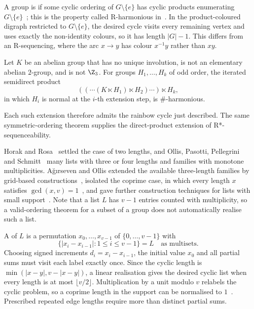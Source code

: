 A group is  if some cyclic ordering of $G\setminus\{e\}$ has cyclic products enumerating $G\setminus\{e\}$~\cite[Definition~1.4]{jav26}; this is the property called R-harmonious in~\cite{jav25}. In the product-coloured digraph restricted to $G\setminus\{e\}$, the desired cycle visits every remaining vertex and uses exactly the non-identity colours, so it has length $|G|-1$. This differs from an R-sequencing, where the arc $x\to y$ has colour $x^{-1}y$ rather than $xy$.

\begin{theorem}\label{thm:sharp}
Let $K$ be an abelian group that has no unique involution, is not an elementary abelian $2$-group, and is not $\Z_3$. For groups $H_1,\dots,H_k$ of odd order, the iterated semidirect product
\[
((\cdots(K\ltimes H_1)\ltimes H_2)\cdots)\ltimes H_k,
\]
in which $H_i$ is normal at the $i$-th extension step, is $\#$-harmonious.
\end{theorem}

Each such extension therefore admits the rainbow cycle just described. The same symmetric-ordering theorem supplies the direct-product extension of R*-sequenceability.


Horak and Rosa~\cite{hr09} settled the case of two lengths, and Ollis, Pasotti, Pellegrini and Schmitt~\cite{opps20} many lists with three or four lengths and families with monotone multiplicities. A\u{g}\i rseven and Ollis extended the available three-length families by grid-based constructions~\cite{ao24}, isolated the coprime case, in which every length $x$ satisfies $\gcd(x,v)=1$~\cite{ao24b}, and gave further construction techniques for lists with small support~\cite{ao25}. Note that a list $L$ has $v-1$ entries counted with multiplicity, so a valid-ordering theorem for a subset of a group does not automatically realise such a list.

A  of $L$ is a permutation $x_0,\dots,x_{v-1}$ of $\{0,\dots,v-1\}$ with
\[
\{|x_i-x_{i-1}|:1\leq i\leq v-1\}=L\quad\text{as multisets}.
\]
Choosing signed increments $d_i=x_i-x_{i-1}$, the initial value $x_0$ and all partial sums must visit each label exactly once. Since the cyclic length is $\min(|x-y|,v-|x-y|)$, a linear realisation gives the desired cyclic list when every length is at most $\lfloor v/2\rfloor$. Multiplication by a unit modulo $v$ relabels the cyclic problem, so a coprime length in the support can be normalised to $1$~\cite[\S1]{ao24b}. Prescribed repeated edge lengths require more than distinct partial sums.

